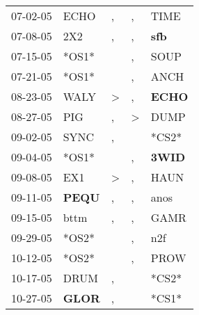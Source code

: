 \begin{supertabular}{p{0.07\textwidth}p{0.06\textwidth}p{0.02\textwidth}p{0.02\textwidth}p{0.06\textwidth}}
          07-02-05\textsuperscript{} &           ECHO\textsuperscript{} &                , &             , &           TIME\textsuperscript{} \\
          07-08-05\textsuperscript{} &            2X2\textsuperscript{} &                , &             , &   \textbf{sfb\textsuperscript{}} \\
          07-15-05\textsuperscript{} &                            *OS1* &                  &             , &           SOUP\textsuperscript{} \\
          07-21-05\textsuperscript{} &                            *OS1* &                  &             , &           ANCH\textsuperscript{} \\
          08-23-05\textsuperscript{} &           WALY\textsuperscript{} &     \textgreater &             , &  \textbf{ECHO\textsuperscript{}} \\
          08-27-05\textsuperscript{} &            PIG\textsuperscript{} &                , &  \textgreater &           DUMP\textsuperscript{} \\
          09-02-05\textsuperscript{} &           SYNC\textsuperscript{} &                , &               &                            *CS2* \\
          09-04-05\textsuperscript{} &                            *OS1* &                  &             , &  \textbf{3WID\textsuperscript{}} \\
          09-08-05\textsuperscript{} &            EX1\textsuperscript{} &     \textgreater &             , &           HAUN\textsuperscript{} \\
          09-11-05\textsuperscript{} &  \textbf{PEQU\textsuperscript{}} &                , &             , &           anos\textsuperscript{} \\
          09-15-05\textsuperscript{} &           bttm\textsuperscript{} &                , &             , &           GAMR\textsuperscript{} \\
          09-29-05\textsuperscript{} &                            *OS2* &                  &             , &            n2f\textsuperscript{} \\
          10-12-05\textsuperscript{} &                            *OS2* &                  &             , &           PROW\textsuperscript{} \\
          10-17-05\textsuperscript{} &           DRUM\textsuperscript{} &                , &               &                            *CS2* \\
          10-27-05\textsuperscript{} &  \textbf{GLOR\textsuperscript{}} &                , &               &                            *CS1* \\

\end{supertabular}
